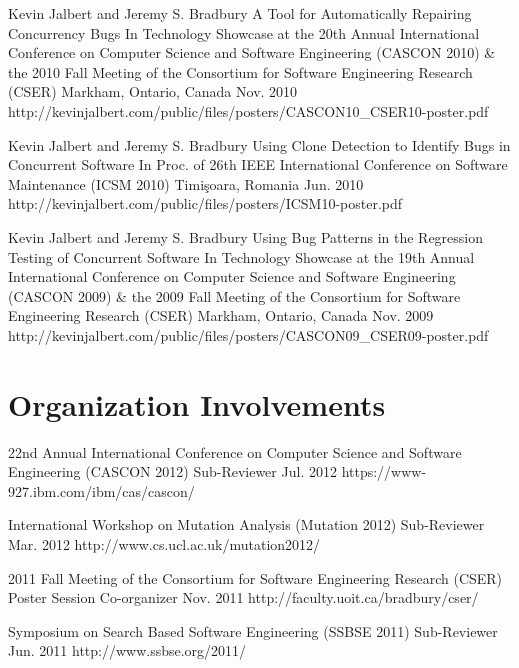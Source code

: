   \posterEntry
    {Kevin Jalbert and Jeremy S. Bradbury}
    {A Tool for Automatically Repairing Concurrency Bugs}
    {In Technology Showcase at the 20th Annual International Conference on Computer Science and Software Engineering (CASCON 2010) \& the 2010 Fall Meeting of the Consortium for Software Engineering Research (CSER)}
    {Markham, Ontario, Canada}
    {Nov. 2010}
    {http://kevinjalbert.com/public/files/posters/CASCON10_CSER10-poster.pdf}

  \posterEntry
    {Kevin Jalbert and Jeremy S. Bradbury}
    {Using Clone Detection to Identify Bugs in Concurrent Software}
    {In Proc. of 26th IEEE International Conference on Software Maintenance (ICSM 2010)}
    {Timi\c{s}oara, Romania}
    {Jun. 2010}
    {http://kevinjalbert.com/public/files/posters/ICSM10-poster.pdf}

  \posterEntry
    {Kevin Jalbert and Jeremy S. Bradbury}
    {Using Bug Patterns in the Regression Testing of Concurrent Software}
    {In Technology Showcase at the 19th Annual International Conference on Computer Science and Software Engineering (CASCON 2009) \& the 2009 Fall Meeting of the Consortium for Software Engineering Research (CSER)}
    {Markham, Ontario, Canada}
    {Nov. 2009}
    {http://kevinjalbert.com/public/files/posters/CASCON09_CSER09-poster.pdf}

  \section{Organization Involvements}

  \organizationInvolvementEntry
    {22nd Annual International Conference on Computer Science and Software Engineering (CASCON 2012)}
    {Sub-Reviewer}
    {Jul. 2012}
    {}
    {https://www-927.ibm.com/ibm/cas/cascon/}
    {}

  \organizationInvolvementEntry
    {International Workshop on Mutation Analysis (Mutation 2012)}
    {Sub-Reviewer}
    {Mar. 2012}
    {}
    {http://www.cs.ucl.ac.uk/mutation2012/}
    {}

  \organizationInvolvementEntry
    {2011 Fall Meeting of the Consortium for Software Engineering Research (CSER)}
    {Poster Session Co-organizer}
    {Nov. 2011}
    {}
    {http://faculty.uoit.ca/bradbury/cser/}
    {}

  \organizationInvolvementEntry
    {Symposium on Search Based Software Engineering (SSBSE 2011)}
    {Sub-Reviewer}
    {Jun. 2011}
    {}
    {http://www.ssbse.org/2011/}
    {}

